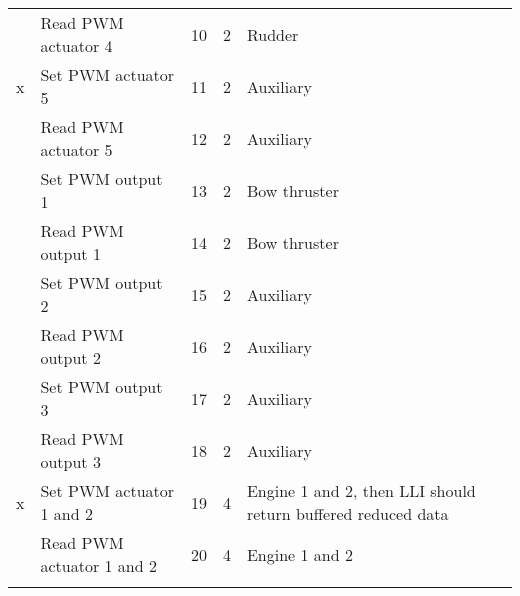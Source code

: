 \begin{table}[h]
\begin{tabular}{llrrl}
	& Read PWM actuator 4 & 10 & 2 & Rudder\\ 
	x& Set PWM actuator 5 & 11 & 2 & Auxiliary\\
	& Read PWM actuator 5 & 12 & 2 & Auxiliary\\ 
	& Set PWM output 1 & 13 & 2 & Bow thruster\\
	& Read PWM output 1 & 14 & 2 & Bow thruster\\ 
	& Set PWM output 2 & 15 & 2 & Auxiliary\\
	& Read PWM output 2 & 16 & 2 & Auxiliary\\ 
	& Set PWM output 3 & 17 & 2 & Auxiliary\\
	& Read PWM output 3 & 18 & 2 & Auxiliary\\
	x& Set PWM actuator 1 and 2  & 19 & 4 & Engine 1 and 2, then LLI should return buffered reduced data\\
	& Read PWM actuator 1 and 2 & 20 & 4 & Engine 1 and 2\\
	\midrule
	\label{tab:commands}
	\end{tabular}
\end{table}
\newpage

